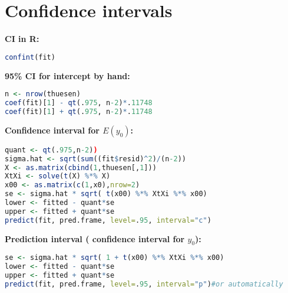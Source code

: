 \section{Confidence intervals}
\textbf{CI in R:} 
\begin{lstlisting}[language=R]
confint(fit)
\end{lstlisting}
\textbf{95\% CI for intercept by hand:} 
\begin{lstlisting}[language=R]
n <- nrow(thuesen)
coef(fit)[1] - qt(.975, n-2)*.11748
coef(fit)[1] + qt(.975, n-2)*.11748
\end{lstlisting}
\textbf{Confidence interval for $E(y_0)$:}
\begin{lstlisting}[language=R]
quant <- qt(.975,n-2))
sigma.hat <- sqrt(sum((fit$resid)^2)/(n-2))
X <- as.matrix(cbind(1,thuesen[,1]))
XtXi <- solve(t(X) %*% X)
x00 <- as.matrix(c(1,x0),nrow=2)
se <- sigma.hat * sqrt( t(x00) %*% XtXi %*% x00)
lower <- fitted - quant*se
upper <- fitted + quant*se
predict(fit, pred.frame, level=.95, interval="c")\end{lstlisting}
\textbf{Prediction interval ( confidence interval for $y_0$):}
\begin{lstlisting}[language = R]
se <- sigma.hat * sqrt( 1 + t(x00) %*% XtXi %*% x00)
lower <- fitted - quant*se
upper <- fitted + quant*se
predict(fit, pred.frame, level=.95, interval="p")#or automatically
\end{lstlisting}